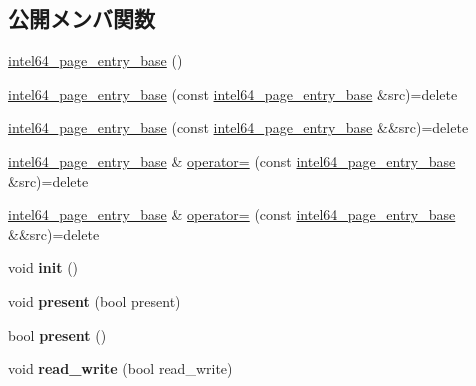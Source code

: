 \subsection*{公開メンバ関数}
\begin{DoxyCompactItemize}
\item 
\hyperlink{classintel64__page__entry__base_aa4b07325975b107d7a39065d3c7f3f70}{intel64\+\_\+page\+\_\+entry\+\_\+base} ()
\item 
\hyperlink{classintel64__page__entry__base_aeea4d63f52154f203bf6a3a834eddb6d}{intel64\+\_\+page\+\_\+entry\+\_\+base} (const \hyperlink{classintel64__page__entry__base}{intel64\+\_\+page\+\_\+entry\+\_\+base} \&src)=delete
\item 
\hyperlink{classintel64__page__entry__base_a6590bbc362f52b6e0a2480e02f3e3eb6}{intel64\+\_\+page\+\_\+entry\+\_\+base} (const \hyperlink{classintel64__page__entry__base}{intel64\+\_\+page\+\_\+entry\+\_\+base} \&\&src)=delete
\item 
\hyperlink{classintel64__page__entry__base}{intel64\+\_\+page\+\_\+entry\+\_\+base} \& \hyperlink{classintel64__page__entry__base_a3d3172d56b2753c79b5d8f92aa186f6d}{operator=} (const \hyperlink{classintel64__page__entry__base}{intel64\+\_\+page\+\_\+entry\+\_\+base} \&src)=delete
\item 
\hyperlink{classintel64__page__entry__base}{intel64\+\_\+page\+\_\+entry\+\_\+base} \& \hyperlink{classintel64__page__entry__base_a4d369c95ee68ab21c0e56e3b82752b39}{operator=} (const \hyperlink{classintel64__page__entry__base}{intel64\+\_\+page\+\_\+entry\+\_\+base} \&\&src)=delete
\item 
\hypertarget{classintel64__page__entry__base_a3335b0b3dfaae7c73cd1c5fbc162aaf8}{}\label{classintel64__page__entry__base_a3335b0b3dfaae7c73cd1c5fbc162aaf8} 
void {\bfseries init} ()
\item 
\hypertarget{classintel64__page__entry__base_a4fcb76a49ecb6fbb355d56879db69f2e}{}\label{classintel64__page__entry__base_a4fcb76a49ecb6fbb355d56879db69f2e} 
void {\bfseries present} (bool present)
\item 
\hypertarget{classintel64__page__entry__base_a7d3ef460bab67263f3804911070a89b8}{}\label{classintel64__page__entry__base_a7d3ef460bab67263f3804911070a89b8} 
bool {\bfseries present} ()
\item 
\hypertarget{classintel64__page__entry__base_a8828b905bf1dbc704b8786b31a90fad0}{}\label{classintel64__page__entry__base_a8828b905bf1dbc704b8786b31a90fad0} 
void {\bfseries read\+\_\+write} (bool read\+\_\+write)
\item 

\end{DoxyCompactItemize}
